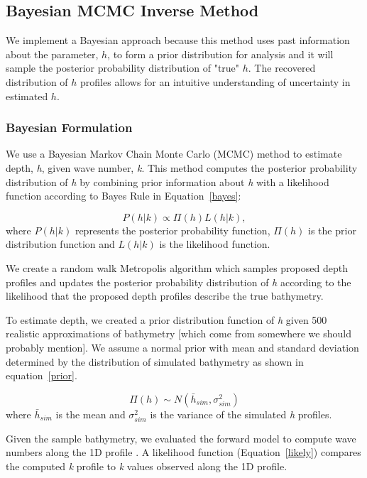 \subsection{Bayesian MCMC Inverse Method}
We implement a Bayesian approach because this method uses past information about the parameter, $h$, to form a prior distribution for analysis and it will sample the posterior probability distribution of "true" $h$. The recovered distribution of $h$ profiles allows for an intuitive understanding of uncertainty in estimated $h$.

\subsubsection{Bayesian Formulation}

We use a Bayesian Markov Chain Monte Carlo (MCMC) method to estimate depth, \textit{h}, given wave number, \textit{k}. %
This method computes the posterior probability distribution of \textit{h} by combining prior information about \textit{h} with a likelihood function according to Bayes Rule in Equation~\ref{bayes}: 


\begin{equation}\label{bayes}
P(h|%
k) \propto \Pi(h)L(h|%
k),
\end{equation} 
where $P(h|%
k)$ represents the posterior probability function, $\Pi(h)$ is the prior distribution function and $L(h|%
k)$ is the likelihood function.

We create a random walk Metropolis algorithm \citep{Metropolis1953} which samples proposed depth profiles and updates the posterior probability distribution of \textit{h} according to the likelihood that the proposed depth profiles describe the true bathymetry. 

To estimate depth, we created a prior distribution function of \textit{h} given 500 realistic approximations of bathymetry [which come from somewhere we should probably mention].  We assume a normal prior with mean and standard deviation determined by the distribution of simulated bathymetry as shown in equation~\ref{prior}. 

\begin{equation}\label{prior}
\Pi(h) \sim N(\bar{h}_{sim},\sigma_{sim}^2)
\end{equation}
where $\bar{h}_{sim}$ is the mean and $\sigma_{sim}^2$ is the variance of the simulated \textit{h} profiles. 

Given the sample bathymetry, we evaluated the forward model to compute wave numbers along the 1D profile%
. A likelihood function (Equation~\ref{likely}) compares the computed \textit{k} profile to \textit{k} values observed along the 1D profile. 

